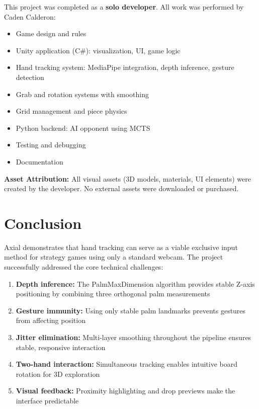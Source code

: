 \documentclass[11pt]{article}
\begin{document}
This project was completed as a \textbf{solo developer}. All work was performed by Caden Calderon:

\begin{itemize}
    \item Game design and rules
    \item Unity application (C\#): visualization, UI, game logic
    \item Hand tracking system: MediaPipe integration, depth inference, gesture detection
    \item Grab and rotation systems with smoothing
    \item Grid management and piece physics
    \item Python backend: AI opponent using MCTS
    \item Testing and debugging
    \item Documentation
\end{itemize}

\textbf{Asset Attribution:} All visual assets (3D models, materials, UI elements) were created by the developer. No external assets were downloaded or purchased.

\section{Conclusion}

Axial demonstrates that hand tracking can serve as a viable exclusive input method for strategy games using only a standard webcam. The project successfully addressed the core technical challenges:

\begin{enumerate}
    \item \textbf{Depth inference:} The PalmMaxDimension algorithm provides stable Z-axis positioning by combining three orthogonal palm measurements
    \item \textbf{Gesture immunity:} Using only stable palm landmarks prevents gestures from affecting position
    \item \textbf{Jitter elimination:} Multi-layer smoothing throughout the pipeline ensures stable, responsive interaction
    \item \textbf{Two-hand interaction:} Simultaneous tracking enables intuitive board rotation for 3D exploration
    \item \textbf{Visual feedback:} Proximity highlighting and drop previews make the interface predictable
\end{enumerate}
\end{document}
